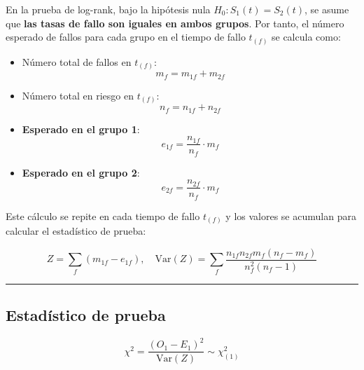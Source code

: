 \documentclass[
]{article}
\begin{document}
\begin{tcolorbox}[enhanced jigsaw, arc=.35mm, coltitle=black, opacitybacktitle=0.6, colbacktitle=quarto-callout-note-color!10!white, breakable, toprule=.15mm, titlerule=0mm, colframe=quarto-callout-note-color-frame, colback=white, bottomrule=.15mm, leftrule=.75mm, rightrule=.15mm, bottomtitle=1mm, toptitle=1mm, opacityback=0, left=2mm, title=\textcolor{quarto-callout-note-color}{\faInfo}\hspace{0.5em}{Cálculo del número esperado bajo \(H_0\)}]

En la prueba de log-rank, bajo la hipótesis nula
\(H_0: S_1(t) = S_2(t)\), se asume que \textbf{las tasas de fallo son
iguales en ambos grupos}. Por tanto, el número esperado de fallos para
cada grupo en el tiempo de fallo \(t_{(f)}\) se calcula como:

\begin{itemize}
\item
  Número total de fallos en \(t_{(f)}\):\\
  \[
  m_f = m_{1f} + m_{2f}
  \]
\item
  Número total en riesgo en \(t_{(f)}\):\\
  \[
  n_f = n_{1f} + n_{2f}
  \]
\item
  \textbf{Esperado en el grupo 1}:\\
  \[
  e_{1f} = \frac{n_{1f}}{n_f} \cdot m_f
  \]
\item
  \textbf{Esperado en el grupo 2}:\\
  \[
  e_{2f} = \frac{n_{2f}}{n_f} \cdot m_f
  \]
\end{itemize}

Este cálculo se repite en cada tiempo de fallo \(t_{(f)}\) y los valores
se acumulan para calcular el estadístico de prueba:

\[
Z = \sum_f (m_{1f} - e_{1f}), \quad \text{Var}(Z) = \sum_f \frac{n_{1f}n_{2f}m_f(n_f - m_f)}{n_f^2(n_f - 1)}
\]

\end{tcolorbox}

\begin{center}\rule{0.5\linewidth}{0.5pt}\end{center}

\subsection{Estadístico de prueba}\label{estaduxedstico-de-prueba}

\[
\chi^2 = \frac{(O_1 - E_1)^2}{\text{Var}(Z)} \sim \chi^2_{(1)}
\]
\end{document}
